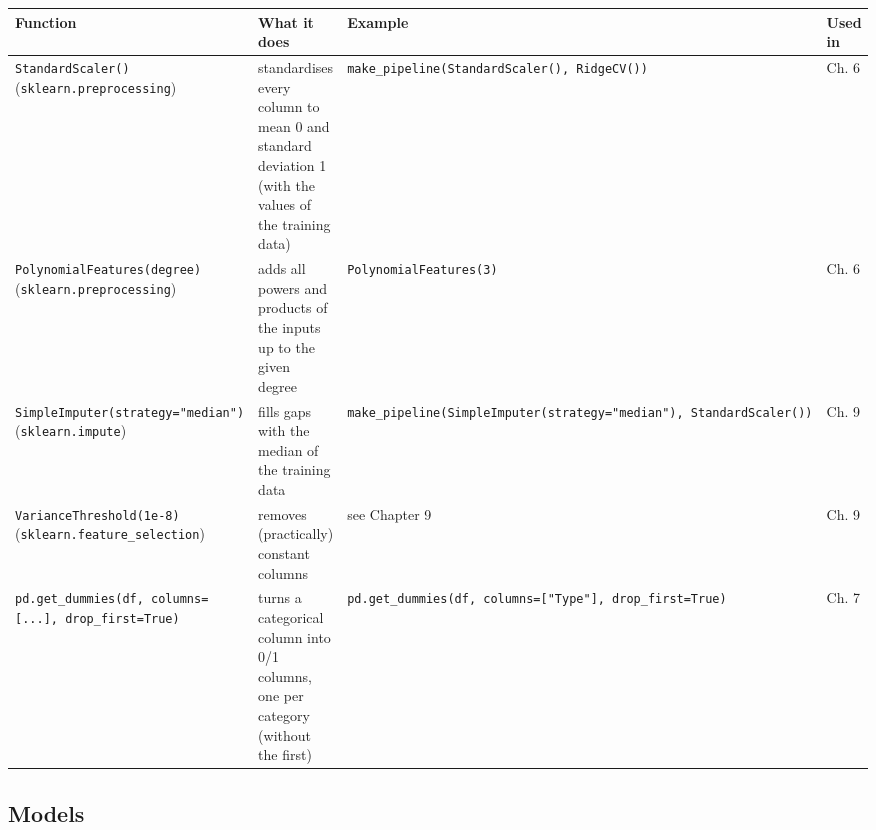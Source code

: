 \documentclass[
  letterpaper,
  DIV=11,
  numbers=noendperiod]{scrreprt}
\begin{document}
\begin{longtable}[]{@{}
  >{\raggedright\arraybackslash}p{}
  >{\raggedright\arraybackslash}p{}
  >{\raggedright\arraybackslash}p{}
  >{\raggedright\arraybackslash}p{}@{}}
\toprule\noalign{}
\begin{minipage}[b]{\linewidth}\raggedright
Function
\end{minipage} & \begin{minipage}[b]{\linewidth}\raggedright
What it does
\end{minipage} & \begin{minipage}[b]{\linewidth}\raggedright
Example
\end{minipage} & \begin{minipage}[b]{\linewidth}\raggedright
Used in
\end{minipage} \\
\midrule\noalign{}
\endhead
\bottomrule\noalign{}
\endlastfoot
\texttt{StandardScaler()} (\texttt{sklearn.preprocessing}) &
standardises every column to mean 0 and standard deviation 1 (with the
values of the training data) &
\texttt{make\_pipeline(StandardScaler(),\ RidgeCV())} & Ch. 6 \\
\texttt{PolynomialFeatures(degree)} (\texttt{sklearn.preprocessing}) &
adds all powers and products of the inputs up to the given degree &
\texttt{PolynomialFeatures(3)} & Ch. 6 \\
\texttt{SimpleImputer(strategy="median")} (\texttt{sklearn.impute}) &
fills gaps with the median of the training data &
\texttt{make\_pipeline(SimpleImputer(strategy="median"),\ StandardScaler())}
& Ch. 9 \\
\texttt{VarianceThreshold(1e-8)} (\texttt{sklearn.feature\_selection}) &
removes (practically) constant columns & see Chapter 9 & Ch. 9 \\
\texttt{pd.get\_dummies(df,\ columns={[}...{]},\ drop\_first=True)} &
turns a categorical column into 0/1 columns, one per category (without
the first) &
\texttt{pd.get\_dummies(df,\ columns={[}"Type"{]},\ drop\_first=True)} &
Ch. 7 \\
\end{longtable}

\subsection{Models}\label{models}
\end{document}

